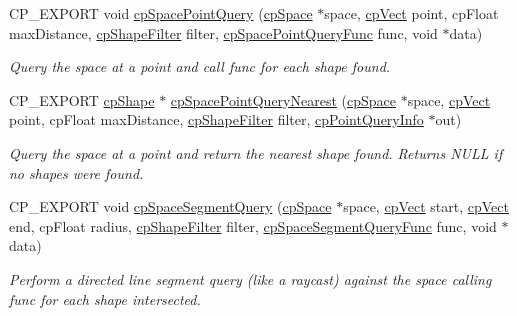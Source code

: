\begin{DoxyCompactItemize}
C\+P\+\_\+\+E\+X\+P\+O\+RT void \hyperlink{group__cpSpace_ga62eea2b00f5503976ef250a33d4c474a}{cp\+Space\+Point\+Query} (\hyperlink{structcpSpace}{cp\+Space} $\ast$space, \hyperlink{structcpVect}{cp\+Vect} point, cp\+Float max\+Distance, \hyperlink{structcpShapeFilter}{cp\+Shape\+Filter} filter, \hyperlink{group__cpSpace_ga646a55f0937f07c19b24561ed5341221}{cp\+Space\+Point\+Query\+Func} func, void $\ast$data)
\begin{DoxyCompactList}\small\item\em Query the space at a point and call {\ttfamily func} for each shape found. \end{DoxyCompactList}\item 
\mbox{\label{group__cpSpace_ga9000c50c4e33b2255d8c3d4c376f0699}} 
C\+P\+\_\+\+E\+X\+P\+O\+RT \hyperlink{structcpShape}{cp\+Shape} $\ast$ \hyperlink{group__cpSpace_ga9000c50c4e33b2255d8c3d4c376f0699}{cp\+Space\+Point\+Query\+Nearest} (\hyperlink{structcpSpace}{cp\+Space} $\ast$space, \hyperlink{structcpVect}{cp\+Vect} point, cp\+Float max\+Distance, \hyperlink{structcpShapeFilter}{cp\+Shape\+Filter} filter, \hyperlink{structcpPointQueryInfo}{cp\+Point\+Query\+Info} $\ast$out)
\begin{DoxyCompactList}\small\item\em Query the space at a point and return the nearest shape found. Returns N\+U\+LL if no shapes were found. \end{DoxyCompactList}\item 
\mbox{\label{group__cpSpace_ga16b9a1e185bea2680a1bc6c798f86049}} 
C\+P\+\_\+\+E\+X\+P\+O\+RT void \hyperlink{group__cpSpace_ga16b9a1e185bea2680a1bc6c798f86049}{cp\+Space\+Segment\+Query} (\hyperlink{structcpSpace}{cp\+Space} $\ast$space, \hyperlink{structcpVect}{cp\+Vect} start, \hyperlink{structcpVect}{cp\+Vect} end, cp\+Float radius, \hyperlink{structcpShapeFilter}{cp\+Shape\+Filter} filter, \hyperlink{group__cpSpace_ga9046beaeba5728c5e954f0f1dc2ae130}{cp\+Space\+Segment\+Query\+Func} func, void $\ast$data)
\begin{DoxyCompactList}\small\item\em Perform a directed line segment query (like a raycast) against the space calling {\ttfamily func} for each shape intersected. \end{DoxyCompactList}\item 
\mbox{\label{group__cpSpace_ga3e5e74241b96f6feff02476030007e68}} 

\end{DoxyCompactItemize}
